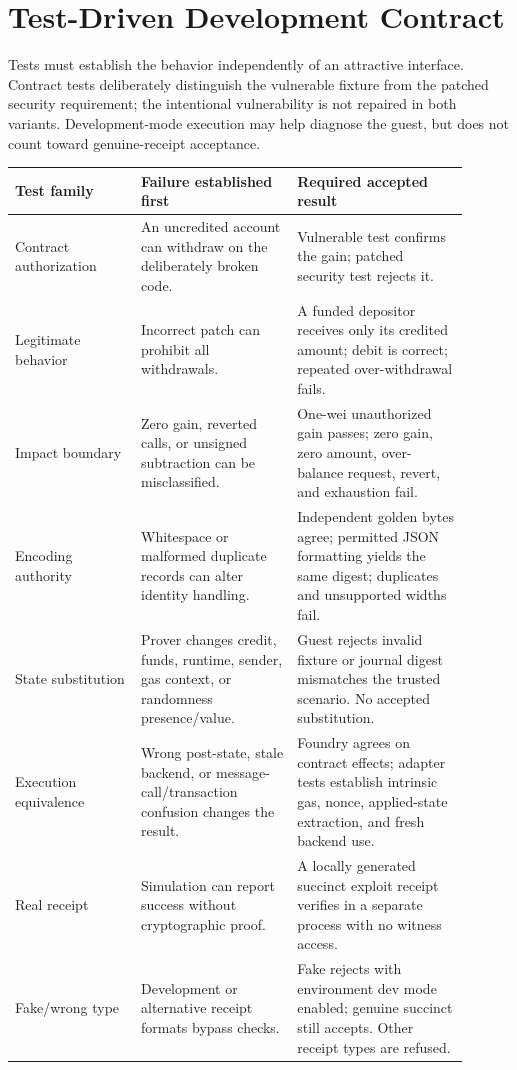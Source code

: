 \documentclass[11pt]{article}
\begin{document}
\section{Test-Driven Development Contract}
Tests must establish the behavior independently of an attractive interface. Contract tests deliberately distinguish the vulnerable fixture from the patched security requirement; the intentional vulnerability is not repaired in both variants. Development-mode execution may help diagnose the guest, but does not count toward genuine-receipt acceptance.

\begin{longtable}{L{0.25\linewidth}L{0.31\linewidth}L{0.34\linewidth}}
\toprule
\textbf{Test family} & \textbf{Failure established first} & \textbf{Required accepted result} \\
\midrule
\endhead
Contract authorization & An uncredited account can withdraw on the deliberately broken code. & Vulnerable test confirms the gain; patched security test rejects it. \\
Legitimate behavior & Incorrect patch can prohibit all withdrawals. & A funded depositor receives only its credited amount; debit is correct; repeated over-withdrawal fails. \\
Impact boundary & Zero gain, reverted calls, or unsigned subtraction can be misclassified. & One-wei unauthorized gain passes; zero gain, zero amount, over-balance request, revert, and exhaustion fail. \\
Encoding authority & Whitespace or malformed duplicate records can alter identity handling. & Independent golden bytes agree; permitted JSON formatting yields the same digest; duplicates and unsupported widths fail. \\
State substitution & Prover changes credit, funds, runtime, sender, gas context, or randomness presence/value. & Guest rejects invalid fixture or journal digest mismatches the trusted scenario. No accepted substitution. \\
Execution equivalence & Wrong post-state, stale backend, or message-call/transaction confusion changes the result. & Foundry agrees on contract effects; adapter tests establish intrinsic gas, nonce, applied-state extraction, and fresh backend use. \\
Real receipt & Simulation can report success without cryptographic proof. & A locally generated succinct exploit receipt verifies in a separate process with no witness access. \\
Fake/wrong type & Development or alternative receipt formats bypass checks. & Fake rejects with environment dev mode enabled; genuine succinct still accepts. Other receipt types are refused. \\

\end{longtable}
\end{document}
